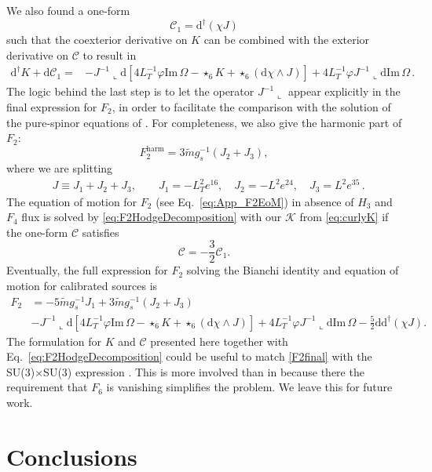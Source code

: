 \documentclass[11pt]{article}
\newcommand{\be}{\begin{equation}}
\newcommand{\ee}{\end{equation}}
\def\be{\begin{equation}}
\def\ee{\end{equation}}
\renewcommand{\[}{\left[}
\renewcommand{\]}{\right]}
\renewcommand{\(}{\left(}
\renewcommand{\)}{\right)}
\renewcommand{\Im}{\text{Im}\,}
\newcommand{\dd}{\mathrm{d}}
\newcommand{\<}{\langle}
\renewcommand{\>}{\rangle}
\begin{document}
We also found a one-form
\be
\mathcal{C}_1 = \dd^\dagger({\chi} J)
\ee
such that the coexterior derivative on $K$ can be combined with the exterior derivative on $\mathcal{C}$ to result in
\begin{align}
\label{eq:ddaggerKplusdC1}
\dd^\dagger K + \dd \mathcal{C}_1 =& - J^{-1}\llcorner \dd \left[4L_T^{-1}\varphi \Im \Omega - \star_6 K + \star_6 (\dd \chi \wedge J) \right]
+ 4 L_T^{-1}\varphi J^{-1}\llcorner \dd  \Im \Omega \,.
\end{align}
The logic behind the last step is to let the operator ${J}^{-1}\llcorner$ appear explicitly in the final expression for $F_2$, in order to facilitate the comparison with the solution of the pure-spinor equations of \cite{Saracco:2012wc}. For completeness, we also give the harmonic part of $F_2$:
\be
	F_2^\text{harm} = 3 \tilde m  g_s^{-1} (J_2+J_3),
\ee 
where we are splitting
\begin{align}
	& J \equiv J_1 + J_2 + J_3,   \qquad  J_1 = - L_T^2 e^{16}, \quad J_2 =  - L^2 e^{24}, \quad J_3 = L^2 e^{35}\,.
\end{align}
The equation of motion for $F_2$ (see Eq.~\eqref{eq:App_F2EoM}) in absence of $H_3$ and $F_4$ flux is solved by \eqref{eq:F2HodgeDecomposition} with our $\mathcal{K}$ from \eqref{eq:curlyK} if the one-form $\mathcal{C}$ satisfies
\be
    \mathcal{C} = -\frac{3}{2}\mathcal{C}_1.
\ee
Eventually, the full expression for $F_2$ solving the Bianchi identity and equation of motion for calibrated sources is
\begin{equation}
\begin{aligned}
\label{F2final}
    F_2 &= -5 \tilde mg_s^{-1}  J_1 + 3 \tilde m  g_s^{-1} (J_2+J_3)\\
    & - J^{-1}\llcorner \dd \left[4L_T^{-1}\varphi \Im \Omega - \star_6 K + \star_6 (\dd \chi \wedge J) \right]+ 4 L_T^{-1}\varphi J^{-1}\llcorner \dd  \Im \Omega - \frac{5}{2}\dd \dd^\dagger (\chi J).
    \end{aligned}
\end{equation}
The formulation for $K$ and $\mathcal{C}$ presented here together with Eq.~\eqref{eq:F2HodgeDecomposition} could be useful to match \eqref{F2final} with the SU(3)$\times$SU(3) expression \cite{unpublished:2021}. This is more involved than in \cite{Marchesano:2020qvg} because there the requirement that $F_6$ is vanishing simplifies the problem. We leave this for future work.


\section{Conclusions}
\label{concl}
\end{document}
